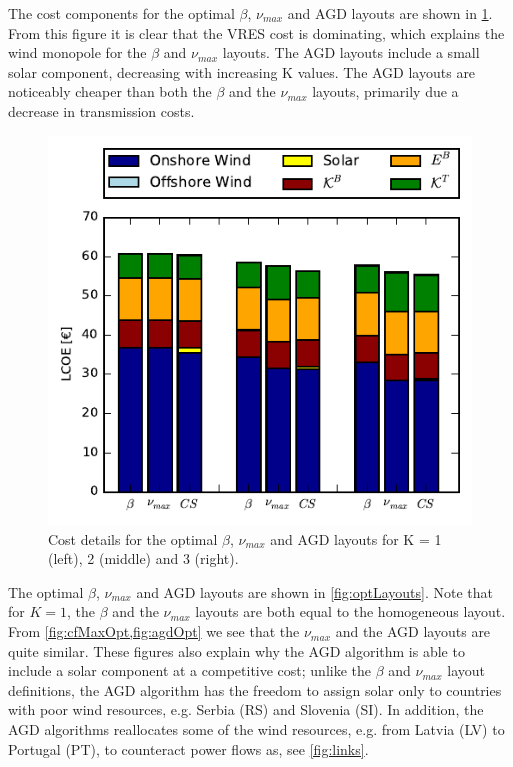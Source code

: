 \documentclass[a4paper, 5p, sort&compress]{elsarticle}%
\begin{document}
The cost components for the optimal $\beta$, $\nu_{max}$ and AGD layouts are
shown in \cref{fig:cost}. From this figure it is clear that the VRES
cost is dominating, which explains the wind monopole for the $\beta$ and
$\nu_{max}$ layouts. The AGD layouts include a small solar component,
decreasing with increasing K values. The AGD layouts are noticeably
cheaper than both the $\beta$ and the $\nu_{max}$ layouts, primarily due a
decrease in transmission costs.

\begin{figure}[h!]
  \centering
  \includegraphics[width = \columnwidth]{costVE50}
  \caption{Cost details for the optimal $\beta$, $\nu_{max}$ and AGD layouts
    for K = 1 (left), 2 (middle) and 3 (right).}
  \label{fig:cost}
\end{figure}

The optimal $\beta$, $\nu_{max}$ and AGD layouts are shown in
\cref{fig:optLayouts}. Note that for $K=1$, the $\beta$ and the
$\nu_{max}$ layouts are both equal to the homogeneous layout. From
\cref{fig:cfMaxOpt,fig:agdOpt} we see that the $\nu_{max}$ and the AGD
layouts are quite similar. These figures also explain why the AGD
algorithm is able to include a solar component at a competitive cost;
unlike the $\beta$ and $\nu_{max}$ layout definitions, the AGD algorithm has
the freedom to assign solar only to countries with poor wind
resources, e.g. Serbia (RS) and Slovenia (SI). In addition, the AGD
algorithms reallocates some of the wind resources, e.g. from Latvia
(LV) to Portugal (PT), to counteract power flows as, see
\cref{fig:links}.
\end{document}
